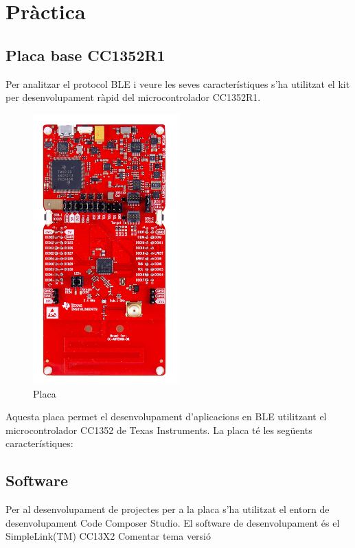 \chapter{Pràctica}
\section{Placa base CC1352R1}
Per analitzar el protocol BLE i veure les seves característiques s'ha utilitzat el kit per desenvolupament ràpid del microcontrolador CC1352R1.
\begin{figure}[h!]
	\begin{center}
		\includegraphics[width=0.5\textwidth]{./images/launchxl-cc1352r1.jpg}
		\caption{Placa \cite{placa}}
	\end{center}
\end{figure}

Aquesta placa permet el desenvolupament d'aplicacions en BLE utilitzant el microcontrolador CC1352 de Texas Instruments.
La placa té les següents característiques:


\section{Software}
Per al desenvolupament de projectes per a la placa s'ha utilitzat el entorn de desenvolupament Code Composer Studio. El software de desenvolupament és el SimpleLink(TM) CC13X2
Comentar tema versió

